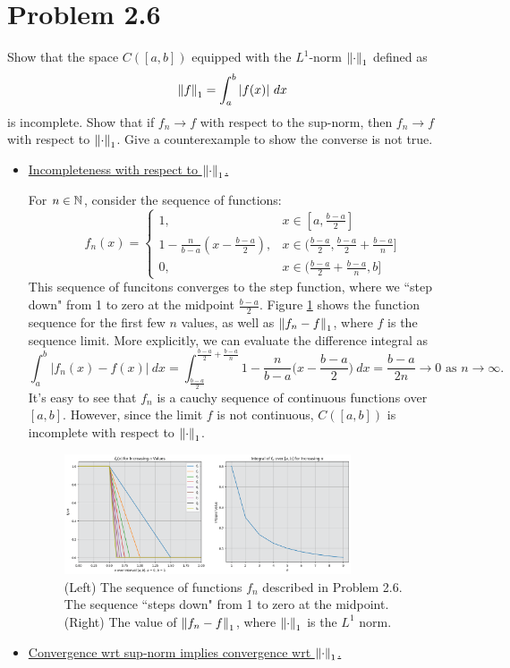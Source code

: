 \section{Problem 2.6}
Show that the space $C([a, b])$ equipped with the $L^1$-norm $\norm{\cdot}_1$ defined as 
\[\norm{f}_1 = \int_a^b |f(x)| \ dx\]
is incomplete. Show that if $f_n \rightarrow f$ with respect to the sup-norm, then $f_n \rightarrow f$ with respect to $\norm{\cdot}_1$. Give a counterexample to show the converse is not true.
\partbreak
\begin{solution}

    \begin{itemize}[-]
        \item \underline{Incompleteness with respect to $\norm{\cdot}_1$.}

        \jump
        For $n \in \mathbb{N}$, consider the sequence of functions:
        \[
        f_n(x) = \begin{cases}
            1, & x \in [a, \frac{b - a}{2}]\\
            1 - \frac{n}{b - a}(x - \frac{b - a}{2}), &x \in (\frac{b - a}{2},  \frac{b - a}{2} + \frac{b - a}{n}]\\
            0, & x \in (\frac{b - a}{2} + \frac{b - a}{n}, b]
        \end{cases}
        \]
        This sequence of funcitons converges to the step function, where we ``step down" from 1 to zero at the midpoint $\frac{b -a}{2}$. Figure \ref{fig:p2.6.1} shows the function sequence for the first few $n$ values, as well as $\norm{f_n - f}_1$, where $f$ is the sequence limit. More explicitly, we can evaluate the difference integral as 
        \[
        \int_a^b |f_n(x) - f(x)| \ dx = \int_{\frac{b - a}{2}}^{\frac{b - a}{2} + \frac{b - a}{n}} 1 - \frac{n}{b - a} \Big(x - \frac{b - a}{2}\Big) \ dx = \frac{b - a}{2n} \rightarrow 0 \text{ as } n \rightarrow \infty. 
        \]
        It's easy to see that $f_n$ is a cauchy sequence of continuous functions over $[a, b]$. However, since the limit $f$ is not continuous, $C([a, b])$ is incomplete with respect to $\norm{\cdot}_1$. 
        

        \begin{figure}[!ht]
            \centering
            \includegraphics[width = 0.8\textwidth]{Images/Problem2.6.1.png}
            \caption{(Left) The sequence of functions $f_n$ described in Problem 2.6. The sequence ``steps down" from 1 to zero at the midpoint. (Right) The value of $\norm{f_n - f}_1$, where $\norm{\cdot}_1$ is the $L^1$ norm.}
            \label{fig:p2.6.1}
        \end{figure}
        \item \underline{Convergence wrt sup-norm implies convergence wrt $\norm{\cdot}_1$.}


\end{itemize}
\end{solution}
